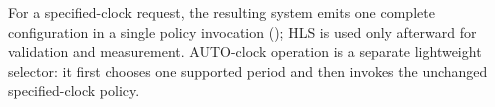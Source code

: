 For a specified-clock request, the resulting system emits one complete
configuration in a single policy invocation (); HLS is used
only afterward for validation and measurement. AUTO-clock operation is a
separate lightweight selector: it first chooses one supported period and
then invokes the unchanged specified-clock policy.


